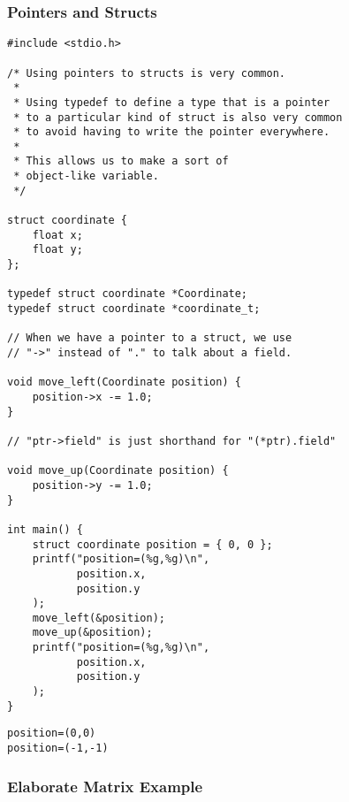 \documentclass[11pt]{article}
\begin{document}
\subsubsection{Pointers and Structs}
\label{sec:org626617a}

\begin{verbatim}
#include <stdio.h>

/* Using pointers to structs is very common.
 * 
 * Using typedef to define a type that is a pointer
 * to a particular kind of struct is also very common
 * to avoid having to write the pointer everywhere.
 * 
 * This allows us to make a sort of 
 * object-like variable.
 */

struct coordinate {
    float x;
    float y;
};

typedef struct coordinate *Coordinate;
typedef struct coordinate *coordinate_t;

// When we have a pointer to a struct, we use
// "->" instead of "." to talk about a field.

void move_left(Coordinate position) {
    position->x -= 1.0;
}

// "ptr->field" is just shorthand for "(*ptr).field"

void move_up(Coordinate position) {
    position->y -= 1.0;
}

int main() {
    struct coordinate position = { 0, 0 };
    printf("position=(%g,%g)\n",
           position.x,
           position.y
    );
    move_left(&position);
    move_up(&position);
    printf("position=(%g,%g)\n",
           position.x,
           position.y
    );
}
\end{verbatim}

\begin{verbatim}
position=(0,0)
position=(-1,-1)
\end{verbatim}

\subsubsection{Elaborate Matrix Example}
\label{sec:org9a95703}
\end{document}
